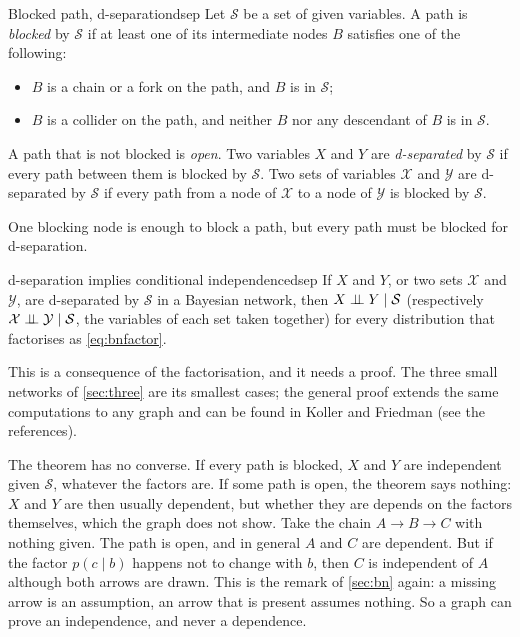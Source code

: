 \begin{definition}{Blocked path, d-separation}{dsep}
Let $\mathcal S$ be a set of given variables. A path is \emph{blocked} by
$\mathcal S$ if at least one of its intermediate nodes $B$ satisfies one
of the following:
\begin{itemize}[nosep]
  \item $B$ is a chain or a fork on the path, and $B$ is in $\mathcal S$;
  \item $B$ is a collider on the path, and neither $B$ nor any descendant
    of $B$ is in $\mathcal S$.
\end{itemize}
A path that is not blocked is \emph{open}. Two variables $X$ and $Y$ are
\emph{d-separated} by $\mathcal S$ if every path between them is blocked
by $\mathcal S$. Two sets of variables $\mathcal X$ and $\mathcal Y$ are
d-separated by $\mathcal S$ if every path from a node of $\mathcal X$ to a
node of $\mathcal Y$ is blocked by $\mathcal S$.
\end{definition}

One blocking node is enough to block a path, but every path must be
blocked for d-separation.

\begin{theorem}{d-separation implies conditional independence}{dsep}
If $X$ and $Y$, or two sets $\mathcal X$ and $\mathcal Y$, are
d-separated by $\mathcal S$ in a Bayesian network, then
$X\mathrel{\perp\!\!\!\perp} Y\mid\mathcal S$ (respectively
$\mathcal X\mathrel{\perp\!\!\!\perp}\mathcal Y\mid\mathcal S$, the variables of each set taken
together) for every distribution that factorises as
\eqref{eq:bnfactor}.
\end{theorem}

This is a consequence of the factorisation, and it needs a proof. The
three small networks of \cref{sec:three} are its smallest cases; the
general proof extends the same computations to any graph and can be found
in Koller and Friedman (see the references).

The theorem has no converse. If every path is blocked, $X$ and $Y$ are
independent given $\mathcal S$, whatever the factors are. If some path is
open, the theorem says nothing: $X$ and $Y$ are then usually dependent,
but whether they are depends on the factors themselves, which the graph
does not show. Take the chain $A\rightarrow B\rightarrow C$ with nothing
given. The path is open, and in general $A$ and $C$ are dependent. But if
the factor $p(c\mid b)$ happens not to change with $b$, then $C$ is
independent of $A$ although both arrows are drawn. This is the remark of
\cref{sec:bn} again: a missing arrow is an assumption, an arrow that is
present assumes nothing. So a graph can prove an independence, and never a
dependence.

